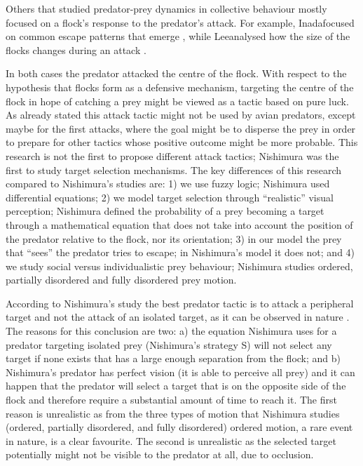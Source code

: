 Others that studied predator-prey dynamics in collective behaviour mostly focused on a flock's response to the predator's attack. For example, Inada\etal focused on common escape patterns that emerge \cite{inada2002order}, while Lee\etal analysed how the size of the flocks changes during an attack \cite{lee2006dynamics}. 

In both cases the predator attacked the centre of the flock. With respect to the hypothesis that flocks form as a defensive mechanism, targeting the centre of the flock in hope of catching a prey might be viewed as a tactic based on pure luck. As already stated this attack tactic might not be used by avian predators, except maybe for the first attacks, where the goal might be to disperse the prey in order to prepare for other tactics whose positive outcome might be more probable. This research is not the first to propose different attack tactics; Nishimura \cite{nishimura2000studying,nishimura2002predator} was the first to study target selection mechanisms. The key differences of this research compared to Nishimura's studies are: 1) we use fuzzy logic; Nishimura used differential equations; 2) we model target selection through ``realistic'' visual perception; Nishimura defined the probability of a prey becoming a target through a mathematical equation that does not take into account the position of the predator relative to the flock, nor its orientation; 3) in our model the prey that ``sees'' the predator tries to escape; in Nishimura's model it does not; and 4) we study social versus individualistic prey behaviour; Nishimura studies ordered, partially disordered and fully disordered prey motion.

According to Nishimura's study \cite{nishimura2002predator} the best predator tactic is to attack a peripheral target and not the attack of an isolated target, as it can be observed in nature \cite{stephens2003modelling,ioannou2012predatory}. The reasons for this conclusion are two: a) the equation Nishimura uses for a predator targeting isolated prey (Nishimura's strategy S) will not select any target if none exists that has a large enough separation from the flock; and b) Nishimura's predator has perfect vision (\ie it is able to perceive all prey) and it can happen that the predator will select a target that is on the opposite side of the flock and therefore require a substantial amount of time to reach it. The first reason is unrealistic as from the three types of motion that Nishimura studies (\ie ordered, partially disordered, and fully disordered) ordered motion, a rare event in nature, is a clear favourite. The second is unrealistic as the selected target potentially might not be visible to the predator at all, due to occlusion.

